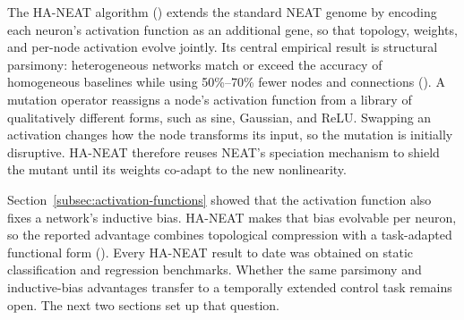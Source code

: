 \documentclass[12pt]{article}
\begin{document}




The HA-NEAT algorithm (\cite{hagg_evolving_2017}) extends the standard NEAT genome by encoding each neuron's activation function as an additional gene, so that topology, weights, and per-node activation evolve jointly.
Its central empirical result is structural parsimony: heterogeneous networks match or exceed the accuracy of homogeneous baselines while using 50\%--70\% fewer nodes and connections (\cite{hagg_evolving_2017}).
A mutation operator reassigns a node's activation function from a library of qualitatively different forms, such as sine, Gaussian, and ReLU.
Swapping an activation changes how the node transforms its input, so the mutation is initially disruptive.
HA-NEAT therefore reuses NEAT's speciation mechanism to shield the mutant until its weights co-adapt to the new nonlinearity.

Section~\ref{subsec:activation-functions} showed that the activation function also fixes a network's inductive bias.
HA-NEAT makes that bias evolvable per neuron, so the reported advantage combines topological compression with a task-adapted functional form (\cite{papavasileiou_optimizing_2022}).
Every HA-NEAT result to date was obtained on static classification and regression benchmarks.
Whether the same parsimony and inductive-bias advantages transfer to a temporally extended control task remains open. The next two sections set up that question.
\end{document}
